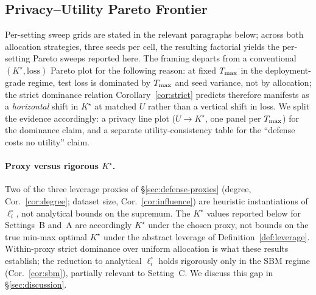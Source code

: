 \subsection{Privacy--Utility Pareto Frontier}
\label{sec:experiments-pareto}

Per-setting sweep grids are stated in the relevant paragraphs below;
across both allocation strategies, three seeds per cell, the resulting
factorial yields the per-setting Pareto sweeps reported here. The
framing departs from a conventional $(K^\star,\text{loss})$ Pareto plot
for the following reason: at fixed $T_{\max}$ in the deployment-grade
regime, test loss is dominated by $T_{\max}$ and seed variance, not by
allocation; the strict dominance relation Corollary~\ref{cor:strict}
predicts therefore manifests as a \emph{horizontal} shift in $K^\star$
at matched $U$ rather than a vertical shift in loss. We split the
evidence accordingly: a privacy line plot ($U \to K^\star$, one panel
per $T_{\max}$) for the dominance claim, and a separate
utility-consistency table for the ``defense costs no utility'' claim.

\paragraph{Proxy versus rigorous $K^\star$.}
Two of the three leverage proxies of \S\ref{sec:defense-proxies}
(degree, Cor.~\ref{cor:degree}; dataset size,
Cor.~\ref{cor:influence}) are heuristic instantiations of
$\ell_i^\circ$, not analytical bounds on the supremum. The $K^\star$
values reported below for Settings~B and~A are accordingly $K^\star$
under the chosen proxy, not bounds on the true min-max optimal
$K^\star$ under the abstract leverage of
Definition~\ref{def:leverage}. Within-proxy strict dominance over
uniform allocation is what these results establish; the reduction to
analytical $\ell_i^\circ$ holds rigorously only in the SBM regime
(Cor.~\ref{cor:sbm}), partially relevant to Setting~C. We discuss this
gap in \S\ref{sec:discussion}.


